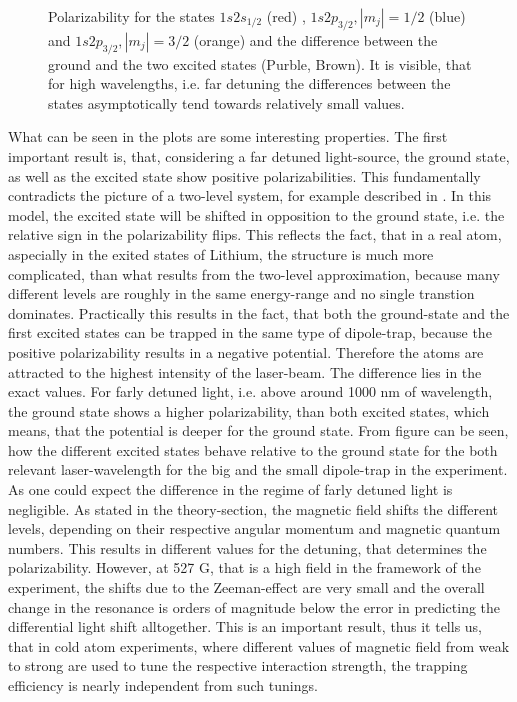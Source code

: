 \begin{figure}[H]
\caption{Polarizability \alpha for the states $1s2s_{1/2}$ (red) , $1s2p_{3/2}, |m_j|=1/2$ (blue) and  $1s2p_{3/2}, |m_j|=3/2$ (orange) and the difference between the ground and the two excited states (Purble, Brown). It is visible, that for high wavelengths, i.e. far detuning the differences between the states asymptotically tend towards relatively small values.}
\label{alphages}
\end{figure}
What can be seen in the plots are some interesting properties. The first important result is, that, considering a far detuned light-source, the ground state, as well as the excited state show positive polarizabilities. This fundamentally contradicts the picture of a two-level system, for example described in \cite{cohen}. In this model, the excited state will be shifted in opposition to the ground state, i.e. the relative sign in the polarizability flips. This reflects the fact, that in a real atom, aspecially in the exited states of Lithium, the structure is much more complicated, than what results from the two-level approximation, because many different levels are roughly in the same energy-range and no single transtion dominates. Practically this results in the fact, that both the ground-state and the first excited states can be trapped in the same type of dipole-trap, because the positive polarizability results in a negative potential. Therefore the atoms are attracted to the highest intensity of the laser-beam. The difference lies in the exact values. For farly detuned light, i.e. above around 1000 nm of wavelength, the ground state shows a higher polarizability, than both excited states, which means, that the potential is deeper for the ground state. From figure \label{relativealpha} can be seen, how the different excited states behave relative to the ground state for the both relevant laser-wavelength for the big and the small dipole-trap in the experiment. As one could expect the difference in the regime of farly detuned light is negligible. As stated in the theory-section, the magnetic field shifts the different levels, depending on their respective angular momentum and magnetic quantum numbers. This results in different values for the detuning, that determines the polarizability. However, at 527 G, that is a high field in the framework of the experiment, the shifts due to the Zeeman-effect are very small and the overall change in the resonance is orders of magnitude below the error in predicting the differential light shift alltogether. This is an important result, thus it tells us, that in cold atom experiments, where different values of magnetic field from weak to strong are used to tune the respective interaction strength, the trapping efficiency is nearly independent from such tunings.

